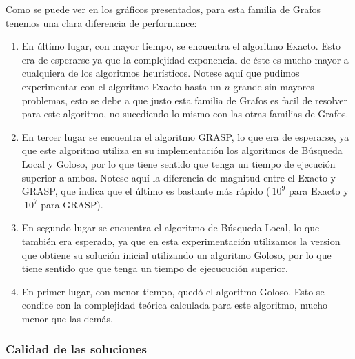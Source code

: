 Como se puede ver en los gráficos presentados, para esta familia de Grafos tenemos una clara diferencia de performance:
\begin{enumerate}
    \item En último lugar, con mayor tiempo, se encuentra el algoritmo Exacto. Esto era de esperarse ya que la complejidad exponencial de éste es mucho mayor a cualquiera de los algoritmos heurísticos. Notese aquí que pudimos experimentar con el algoritmo Exacto hasta un $n$ grande sin mayores problemas, esto se debe a que justo esta familia de Grafos es facil de resolver para este algoritmo, no sucediendo lo mismo con las otras familias de Grafos.
    \item En tercer lugar se encuentra el algoritmo GRASP, lo que era de esperarse, ya que este algoritmo utiliza en su implementación los algoritmos de Búsqueda Local y Goloso, por lo que tiene sentido que tenga un tiempo de ejecución superior a ambos. Notese aquí la diferencia de magnitud entre el Exacto y GRASP, que indica que el último es bastante más rápido ($~10^9$ para Exacto y $~10^7$ para GRASP).
    \item En segundo lugar se encuentra el algoritmo de Búsqueda Local, lo que también era esperado, ya que en esta experimentación utilizamos la version que obtiene su solución inicial utilizando un algoritmo Goloso, por lo que tiene sentido que que tenga un tiempo de ejecucución superior.
    \item En primer lugar, con menor tiempo, quedó el algoritmo Goloso. Esto se condice con la complejidad teórica calculada para este algoritmo, mucho menor que las demás.
\end{enumerate}

\subsubsection{Calidad de las soluciones}
\begin{center}
\end{center}


